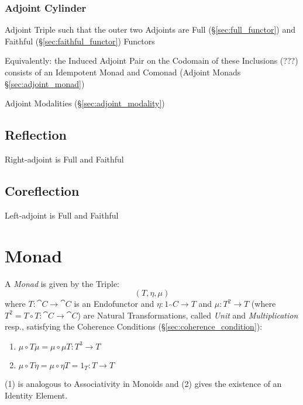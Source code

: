 \subsubsection{Adjoint Cylinder}\label{sec:adjoint_cylinder}

Adjoint Triple such that the outer two Adjoints are Full
(\S\ref{sec:full_functor}) and Faithful (\S\ref{sec:faithful_functor})
Functors

Equivalently: the Induced Adjoint Pair on the Codomain of these
Inclusions (???) consists of an Idempotent Monad and Comonad (Adjoint
Monads \S\ref{sec:adjoint_monad})

Adjoint Modalities (\S\ref{sec:adjoint_modality})



\subsection{Reflection}\label{sec:reflection_adjunction}

\cite{winskel-nielsen93}

Right-adjoint is Full and Faithful



\subsection{Coreflection}\label{sec:coreflection_adjunction}

\cite{winskel-nielsen93}

Left-adjoint is Full and Faithful



\section{Monad}\label{sec:monad}

A \emph{Monad} is given by the Triple:
\[
  (T, \eta, \mu)
\]
where $T : \cat{C} \rightarrow \cat{C}$ is an Endofunctor and $\eta :
1_\cat{C} \rightarrow T$ and $\mu : T^2 \rightarrow T$ (where $T^2 = T
\circ T : \cat{C} \rightarrow \cat{C}$) are Natural Transformations,
called \emph{Unit} and \emph{Multiplication} resp., satisfying the
Coherence Conditions (\S\ref{sec:coherence_condition}):
\begin{enumerate}
  \item $\mu \circ T\mu = \mu \circ \mu T : T^3 \rightarrow T$
  \item $\mu \circ T\eta = \mu \circ \eta T = 1_T : T \rightarrow T$
\end{enumerate}
(1) is analogous to Associativity in Monoids and (2) gives the
existence of an Identity Element.


